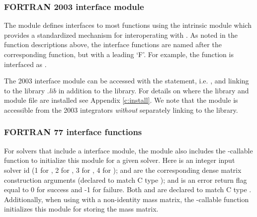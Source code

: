 \subsubsection*{FORTRAN 2003 interface module}
The  {\F} module defines interfaces to most
{\sunmatdense} {\CC} functions using the intrinsic 
module which provides a standardized mechanism for interoperating with {\CC}. As
noted in the {\CC} function descriptions above, the interface functions are
named after the corresponding {\CC} function, but with a leading `F'. For
example, the function  is interfaced as
.

The {\F} 2003 {\sunmatdense} interface module can be accessed with the 
statement, i.e. , and linking to the library
.{\em lib} in addition to the {\CC} library.
For details on where the library and module file
 are installed see Appendix \ref{c:install}.
We note that the module is accessible from the {\F} 2003 {\sundials} integrators
\textit{without} separately linking to the
 library.

\subsubsection*{FORTRAN 77 interface functions}
For solvers that include a {\F} interface module, the {\sunmatdense}
module also includes the {\F}-callable
function  to initialize
this {\sunmatdense} module for a given {\sundials} solver.
Here  is an integer input solver id (1 for {\cvode}, 2 for {\ida}, 3
for {\kinsol}, 4 for {\arkode});  and  are the
corresponding dense matrix construction arguments (declared to
match C type ); and  is an error return flag
equal to 0 for success and -1 for failure. Both  and 
are declared to match C type . Additionally, when using
{\arkode} with a non-identity mass matrix, the {\F}-callable
function  initializes this
{\sunmatdense} module for storing the mass matrix.

